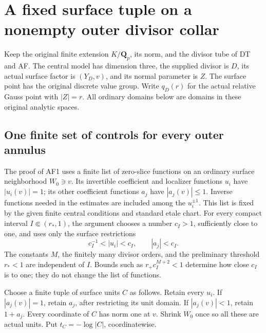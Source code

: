 \section{A fixed surface tuple on a nonempty outer divisor collar}
\label{sec:r13-fixed-surface-tuple-collar}

Keep the original finite extension \(K/\mathbf Q_p\), its norm,
and the divisor tube of DT and AF.  The central model has
dimension three, the supplied divisor is \(D\), its actual
surface factor is \((Y_D,v)\), and its normal parameter is
\(Z\).  The surface point has the original discrete value
group.  Write \(q_D(r)\) for the actual relative Gauss point
with \(|Z|=r\).  All ordinary domains below are domains in
these original analytic spaces.

\subsection{One finite set of controls for every outer annulus}

The proof of AF1 uses a finite list of zero-slice functions
on an ordinary surface neighborhood \(W_0\ni v\).  Its
invertible coefficient and localizer functions \(u_i\) have
\(|u_i(v)|=1\); its other coefficient functions \(a_j\) have
\(|a_j(v)|\leq1\).  Inverse functions needed in the estimates
are included among the \(u_i^{\pm1}\).  This list is fixed by
the given finite central conditions and standard etale chart.
For every compact interval \(I\Subset(r_*,1)\), the argument
chooses a number \(c_I>1\), sufficiently close to one, and
uses only the surface restrictions
\[
       c_I^{-1}<|u_i|<c_I,\qquad |a_j|<c_I.
\tag{UA1}
\]
The constants \(M\), the finitely many divisor orders, and
the preliminary threshold \(r_*<1\) are independent of
\(I\).  Bounds such as \(r_+c_I^{M+2}<1\) determine how
close \(c_I\) is to one; they do not change the list of
functions.

Choose a finite tuple of surface units \(C\) as follows.
Retain every \(u_i\).  If \(|a_j(v)|=1\), retain \(a_j\),
after restricting its unit domain.  If \(|a_j(v)|<1\),
retain \(1+a_j\).  Every coordinate of \(C\) has norm one
at \(v\).  Shrink \(W_0\) once so all these are actual
units.  Put \(t_C=-\log|C|\), coordinatewise.

